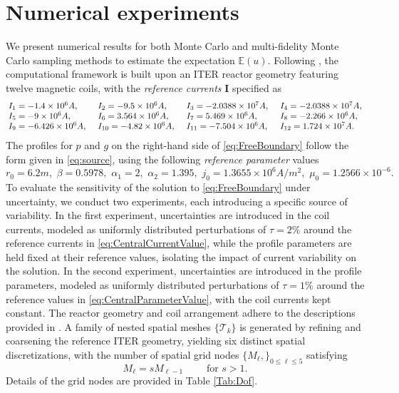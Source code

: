 \section{Numerical experiments}\label{sec:Num-Exp}
%
We present numerical results for both Monte Carlo and multi-fidelity Monte Carlo sampling methods to estimate the expectation $\mathbb{E}(u)$. Following \cite{FaHe:2017}, the computational framework is built upon an ITER reactor geometry featuring twelve magnetic coils, with the \textit{reference currents} $\boldsymbol{I}$ specified as
%
\begin{equation}\label{eq:CentralCurrentValue}
{\renewcommand{\arraycolsep}{2pt}
\begin{array}{llll}
I_1 = -1.4 \times 10^{6} A, \quad & I_2 = -9.5 \times 10^{6} A, \quad & I_3 = -2.0388 \times 10^{7} A, \quad & I_4 = -2.0388 \times 10^{7} A, \\
I_5 = -9 \times 10^{6} A, \quad & I_6 = 3.564 \times 10^{6} A, \quad & I_7 = 5.469 \times 10^{6} A, \quad & I_8 = -2.266 \times 10^{6} A, \\
I_9 = -6.426 \times 10^{6} A, \quad & I_{10} = -4.82 \times 10^{6} A, \quad & I_{11} = -7.504 \times 10^{6} A, \quad & I_{12} = 1.724 \times 10^{7} A. 
\end{array}
}
\end{equation}
%
The profiles for $p$ and $g$ on the right-hand side of \eqref{eq:FreeBoundary} follow the form given in \eqref{eq:source}, using the following \textit{reference parameter} values
%
\begin{equation}\label{eq:CentralParameterValue}
r_0=6.2m,\,\,\beta=0.5978, \,\, \alpha_1 = 2, \,\,  \alpha_2=1.395, \,\, j_0=1.3655 \times 10^6 A/m^2,\,\,  \mu_0=1.2566\times 10^{-6}.
\end{equation}
%
To evaluate the sensitivity of the solution to \eqref{eq:FreeBoundary} under uncertainty, we conduct two experiments, each introducing a specific source of variability. In the first experiment, uncertainties are introduced in the coil currents, modeled as uniformly distributed perturbations of $\tau = 2\%$ around the reference currents in \eqref{eq:CentralCurrentValue}, while the profile parameters are held fixed at their reference values, isolating the impact of current variability on the solution.  In the second experiment, uncertainties are introduced in the profile parameters, modeled as uniformly distributed perturbations of $\tau = 1\%$ around the reference values in \eqref{eq:CentralParameterValue}, with the coil currents kept constant. The reactor geometry and coil arrangement adhere to the descriptions provided in \cite{Amoskov:2009}.  A family of nested spatial meshes $\{\mathcal{T}_k\}$ is generated by refining and coarsening the reference ITER geometry, yielding six distinct spatial discretizations, with the number of spatial grid nodes $\{M_\ell,\}_{0\le \ell \le 5}$  satisfying
%
\begin{equation}
\label{eq:MeshGrowth}
M_\ell = s M_{\ell-1} \qquad \text{ for } s>1.
\end{equation}
%
Details of the grid nodes are provided in Table \ref{Tab:Dof}.

